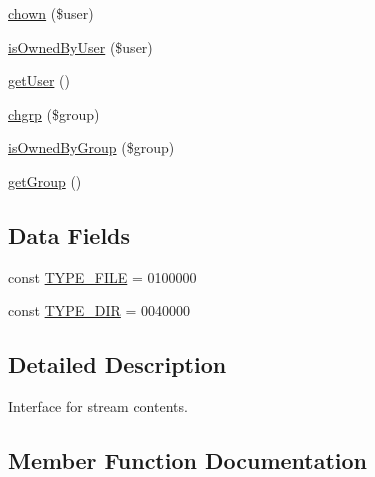 \begin{DoxyCompactItemize}
\item 
\mbox{\hyperlink{interfaceorg_1_1bovigo_1_1vfs_1_1vfs_stream_content_adc7dd498252edfe9eef1bdb602edcbdb}{chown}} (\$user)
\item 
\mbox{\hyperlink{interfaceorg_1_1bovigo_1_1vfs_1_1vfs_stream_content_ad94371c199637d2e0b56ed9771d3fbf6}{is\+Owned\+By\+User}} (\$user)
\item 
\mbox{\hyperlink{interfaceorg_1_1bovigo_1_1vfs_1_1vfs_stream_content_ae81b7186fb97a7c6457edcc68c9aa2ef}{get\+User}} ()
\item 
\mbox{\hyperlink{interfaceorg_1_1bovigo_1_1vfs_1_1vfs_stream_content_ae3667c8a6ad2f23f1163ba4533a20525}{chgrp}} (\$group)
\item 
\mbox{\hyperlink{interfaceorg_1_1bovigo_1_1vfs_1_1vfs_stream_content_a9fd5109b1a5bdb7e28dd6021e914e907}{is\+Owned\+By\+Group}} (\$group)
\item 
\mbox{\hyperlink{interfaceorg_1_1bovigo_1_1vfs_1_1vfs_stream_content_a4f44e7bc9de772c21b4304d11e87bf16}{get\+Group}} ()
\end{DoxyCompactItemize}
\subsection*{Data Fields}
\begin{DoxyCompactItemize}
\item 
const \mbox{\hyperlink{interfaceorg_1_1bovigo_1_1vfs_1_1vfs_stream_content_a6e21fe27fed935d13d258f1b38282e08}{T\+Y\+P\+E\+\_\+\+F\+I\+LE}} = 0100000
\item 
const \mbox{\hyperlink{interfaceorg_1_1bovigo_1_1vfs_1_1vfs_stream_content_adf0b2f30a2daddc69e41c097fa998e18}{T\+Y\+P\+E\+\_\+\+D\+IR}} = 0040000
\end{DoxyCompactItemize}


\subsection{Detailed Description}
Interface for stream contents. 

\subsection{Member Function Documentation}
\mbox{\label{interfaceorg_1_1bovigo_1_1vfs_1_1vfs_stream_content_a1769b12aee6e9730bcf9b56703eb6a03}} 
